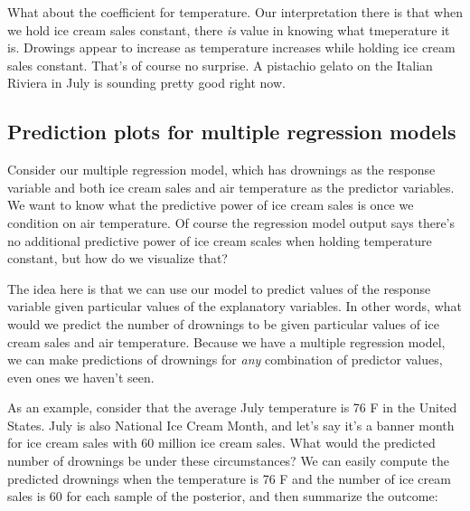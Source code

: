 \documentclass[
]{book}
\newenvironment{Shaded}{\begin{snugshade}}{\end{snugshade}}
\newcommand{\CommentTok}[1]{\textcolor[rgb]{0.56,0.35,0.01}{\textit{#1}}}
\newcommand{\DecValTok}[1]{\textcolor[rgb]{0.00,0.00,0.81}{#1}}
\newcommand{\FunctionTok}[1]{\textcolor[rgb]{0.13,0.29,0.53}{\textbf{#1}}}
\newcommand{\NormalTok}[1]{#1}
\newcommand{\OtherTok}[1]{\textcolor[rgb]{0.56,0.35,0.01}{#1}}
\newcommand{\SpecialCharTok}[1]{\textcolor[rgb]{0.81,0.36,0.00}{\textbf{#1}}}
\begin{document}
What about the coefficient for temperature. Our interpretation there is that when we hold ice cream sales constant, there \emph{is} value in knowing what tmeperature it is. Drowings appear to increase as temperature increases while holding ice cream sales constant. That's of course no surprise. A pistachio gelato on the Italian Riviera in July is sounding pretty good right now.

\subsection{Prediction plots for multiple regression models}\label{prediction-plots-for-multiple-regression-models}

Consider our multiple regression model, which has drownings as the response variable and both ice cream sales and air temperature as the predictor variables. We want to know what the predictive power of ice cream sales is once we condition on air temperature. Of course the regression model output says there's no additional predictive power of ice cream scales when holding temperature constant, but how do we visualize that?

The idea here is that we can use our model to predict values of the response variable given particular values of the explanatory variables. In other words, what would we predict the number of drownings to be given particular values of ice cream sales and air temperature. Because we have a multiple regression model, we can make predictions of drownings for \emph{any} combination of predictor values, even ones we haven't seen.

As an example, consider that the average July temperature is 76 F in the United States. July is also National Ice Cream Month, and let's say it's a banner month for ice cream sales with 60 million ice cream sales. What would the predicted number of drownings be under these circumstances? We can easily compute the predicted drownings when the temperature is 76 F and the number of ice cream sales is 60 for each sample of the posterior, and then summarize the outcome:

\begin{Shaded}
\end{Shaded}
\end{document}
